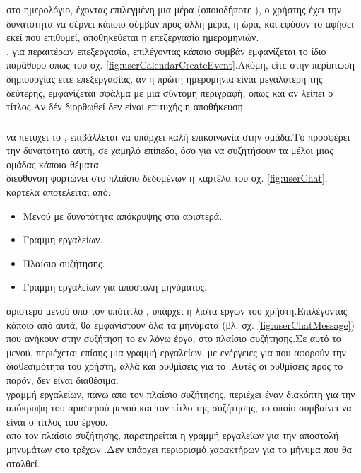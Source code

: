  στο ημερολόγιο, έχοντας επιλεγμένη μια μέρα (οποιοδήποτε ), ο χρήστης έχει την δυνατότητα να σέρνει κάποιο σύμβαν προς άλλη μέρα, η ώρα, και εφόσον το αφήσει εκεί που επιθυμεί, αποθηκεύεται η επεξεργασία ημερομηνιών.\\
, για περαιτέρων επεξεργασία, επιλέγοντας κάποιο συμβάν εμφανίζεται το ίδιο παράθυρο όπως του σχ. \ref{fig:userCalendarCreateEvent}.Ακόμη, είτε στην περίπτωση δημιουργίας είτε επεξεργασίας, αν η πρώτη ημερομηνία είναι μεγαλύτερη της δεύτερης, εμφανίζεται σφάλμα με μια σύντομη περιγραφή, όπως και αν λείπει ο τίτλος.Αν δέν διορθωθεί δεν είναι επιτυχής η αποθήκευση.

\subsubsection*{}
 να πετύχει το , επιβάλλεται να υπάρχει καλή επικοινωνία στην ομάδα.Το  προσφέρει την δυνατότητα αυτή, σε χαμηλό επίπεδο, όσο για να συζητήσουν τα μέλοι μιας ομάδας κάποια θέματα.\\
 διεύθυνση  φορτώνει στο πλαίσιο δεδομένων η καρτέλα του σχ. \ref{fig:userChat}.\\
 καρτέλα αποτελείται από:\\
\begin{itemize}
	\item Μενού με δυνατότητα απόκρυψης στα αριστερά.
	\item Γραμμη εργαλείων.
	\item Πλαίσιο συζήτησης.
	\item Γραμμη εργαλείων για αποστολή μηνύματος.
\end{itemize}

 αριστερό μενού υπό τον υπότιτλο , υπάρχει η λίστα έργων του χρήστη.Επιλέγοντας κάποιο από αυτά, θα εμφανίστουν όλα τα μηνύματα (βλ. σχ. \ref{fig:userChatMessage}) που ανήκουν στην συζήτηση το εν λόγω έργο, στο πλαίσιο συζήτησης.Σε αυτό το μενού, περιέχεται επίσης μια γραμμή εργαλείων, με ενέργειες για που αφορούν την διαθεσιμότητα του χρήστη, αλλά και ρυθμίσεις για το .Αυτές οι ρυθμίσεις προς το παρόν, δεν είναι διαθέσιμα.\\
\pagebreak
{} γραμμή εργαλείων, πάνω απο τον πλαίσιο συζήτησης, περιέχει έναν διακόπτη για την απόκρυψη του αριστερού μενού και τον τίτλο της συζήτησης, το οποίο συμβαίνει να είναι ο τίτλος του έργου.\\
 απο τον πλαίσιο συζήτησης, παρατηρείται η γραμμή εργαλείων για την αποστολή μηνυμάτων στο τρέχων .Δεν υπάρχει περιορισμό χαρακτήρων για το μήνυμα που θα σταλθεί.\\

